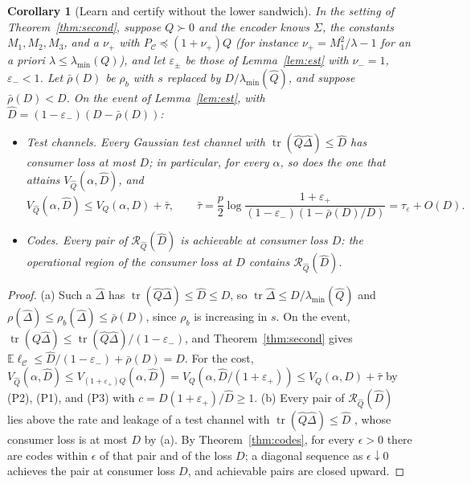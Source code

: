 \documentclass[11pt,onecolumn]{IEEEtran}
\newtheorem{corollary}[theorem]{Corollary}
\newcommand{\E}{\mathbb{E}}
\newcommand{\tr}{\operatorname{tr}}
\newcommand{\PC}{P_{\mathcal C}}
\newcommand{\cR}{\mathcal R}
\newcommand{\nup}{\nu_{+}}
\newcommand{\num}{\nu_{-}}
\newcommand{\epp}{\varepsilon_{+}}
\newcommand{\emm}{\varepsilon_{-}}
\newcommand{\lmin}{\lambda_{\min}}
\begin{document}
\begin{corollary}[Learn and certify without the lower sandwich]\label{cor:cert}
In the setting of Theorem~\ref{thm:second}, suppose $Q\succ0$ and the encoder knows
$\Sigma$, the constants $M_1,M_2,M_3$, and a $\nup$ with $\PC\preceq(1+\nup)Q$ (for instance
$\nup=M_1^2/\lambda-1$ for an a priori $\lambda\le\lmin(Q)$), and let $\varepsilon_\pm$
be those of Lemma~\ref{lem:est} with $\num=1$, $\emm<1$. Let $\bar\rho(D)$ be $\rho_b$
with $s$ replaced by $D/\lmin(\hat Q)$, and suppose $\bar\rho(D)<D$. On the event of
Lemma~\ref{lem:est}, with $\hat D=(1-\emm)(D-\bar\rho(D))$:
\begin{itemize}
\item[(a)] \emph{Test channels.} Every Gaussian test channel with
$\tr(\hat Q\hat\Delta)\le\hat D$ has consumer loss at most $D$; in particular, for every
$\alpha$, so does the one that attains $V_{\hat Q}(\alpha,\hat D)$, and
\[
V_{\hat Q}(\alpha,\hat D)\le V_Q(\alpha,D)+\bar\tau,\qquad
\bar\tau=\frac p2\log\frac{1+\epp}{(1-\emm)(1-\bar\rho(D)/D)}=\tau_\varepsilon+O(D).
\]
\item[(b)] \emph{Codes.} Every pair of $\cR_{\hat Q}(\hat D)$ is achievable at consumer
loss $D$: the operational region of the consumer loss at $D$ contains
$\cR_{\hat Q}(\hat D)$.
\end{itemize}
\end{corollary}

\begin{proof}
(a) Such a $\hat\Delta$ has $\tr(\hat Q\hat\Delta)\le\hat D\le D$, so
$\tr\hat\Delta\le D/\lmin(\hat Q)$ and $\rho(\hat\Delta)\le\rho_b(\hat\Delta)\le\bar\rho(D)$,
since $\rho_b$ is increasing in $s$. On the event,
$\tr(Q\hat\Delta)\le\tr(\hat Q\hat\Delta)/(1-\emm)$, and Theorem~\ref{thm:second} gives
$\E\ell_{\mathcal C}\le\hat D/(1-\emm)+\bar\rho(D)=D$. For the cost,
$V_{\hat Q}(\alpha,\hat D)\le V_{(1+\epp)Q}(\alpha,\hat D)
=V_Q(\alpha,\hat D/(1+\epp))\le V_Q(\alpha,D)+\bar\tau$ by (P2), (P1), and (P3) with
$c=D(1+\epp)/\hat D\ge1$.
(b) Every pair of $\cR_{\hat Q}(\hat D)$ lies above the rate and leakage of a test
channel with $\tr(\hat Q\hat\Delta)\le\hat D$ \cite[Proposition~2, Theorem~3]{part1},
whose consumer loss is at most $D$ by (a). By Theorem~\ref{thm:codes}, for every
$\epsilon>0$ there are codes within $\epsilon$ of that pair and of the loss $D$; a
diagonal sequence as $\epsilon\downarrow0$ achieves the pair at consumer loss $D$, and
achievable pairs are closed upward.
\end{proof}
\end{document}
